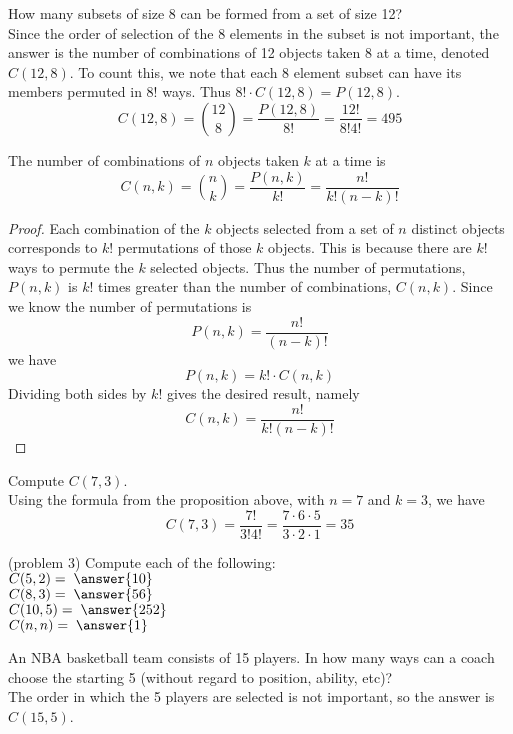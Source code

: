 \documentclass[handout]{ximera}
\begin{document}
\begin{example}[example 2]
How many subsets of size 8 can be formed from a set of size 12?\\
Since the order of selection of the 8 elements in the subset is not important, the answer is the number of combinations of 12 objects taken 8 at a time, denoted $C(12,8)$.  To count this, we note that each 8 element subset can have its members permuted in $8!$ ways. Thus $8! \cdot C(12,8) = P(12,8)$.
\[
C(12,8) = \binom{12}{8} = \frac{P(12,8)}{8!} = \frac{12!}{8!4!} =  495
\]
\end{example}
\begin{proposition}
The number of combinations of $n$ objects taken $k$ at a time is
\[
C(n,k) = \binom{n}{k} = \frac{P(n,k)}{k!} = \frac{n!}{k!(n-k)!}
\]

\end{proposition}
\begin{proof}
Each combination of the $k$ objects selected from a set of $n$ distinct objects 
corresponds to $k!$ permutations of those $k$ objects.  
This is because there are $k!$ ways to permute the $k$ selected objects.
Thus the number of permutations, $P(n,k)$ is $k!$ times greater than the 
number of combinations, $C(n,k)$. Since we know the number of permutations is 
\[
P(n,k) = \frac{n!}{(n-k)!}
\]
we have
\[
P(n,k) = k!\cdot C(n,k)
\]
Dividing both sides by $k!$ gives the desired result, namely
\[
C(n,k) = \frac{n!}{k!(n-k)!}
\]


\end{proof}


\begin{example}[example 3]
Compute $C(7, 3)$.\\
Using the formula from the proposition above, with $n =7$ and $k = 3$, we have
\[
C(7,3) = \frac{7!}{3!4!} = \frac{7 \cdot 6\cdot 5}{3\cdot 2\cdot 1} = 35
\]
\end{example}


\begin{problem}(problem 3)
Compute each of the following:\\
$C(5,2) = \; \answer{10}$\\
$C(8,3) = \; \answer{56}$\\
$C(10,5) = \; \answer{252}$\\
$C(n,n) = \; \answer{1}$
\end{problem}



\begin{example}[example 4]
An NBA basketball team consists of 15 players.  In how many ways can a coach choose the 
starting 5 (without regard to position, ability, etc)?\\
The order in which the 5 players are selected is not important, so the answer is $C(15, 5)$.
\end{example}
\end{document}
